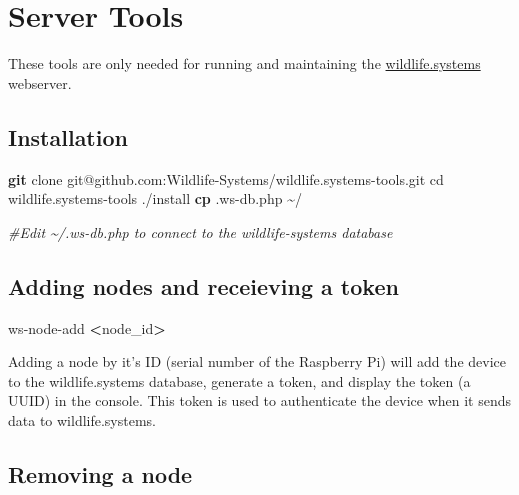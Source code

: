 \documentclass[
]{book}
\newenvironment{Shaded}{\begin{snugshade}}{\end{snugshade}}
\newcommand{\BuiltInTok}[1]{#1}
\newcommand{\CommentTok}[1]{\textcolor[rgb]{0.56,0.35,0.01}{\textit{#1}}}
\newcommand{\ExtensionTok}[1]{#1}
\newcommand{\FunctionTok}[1]{\textcolor[rgb]{0.13,0.29,0.53}{\textbf{#1}}}
\newcommand{\NormalTok}[1]{#1}
\newcommand{\OperatorTok}[1]{\textcolor[rgb]{0.81,0.36,0.00}{\textbf{#1}}}
\begin{document}
\hypertarget{server-tools}{%
\chapter{Server Tools}\label{server-tools}}

These tools are only needed for running and maintaining the \href{https://wildlife.systems}{wildlife.systems} webserver.

\hypertarget{installation}{%
\section{Installation}\label{installation}}

\begin{Shaded}
\begin{Highlighting}[]
\FunctionTok{git}\NormalTok{ clone git@github.com:Wildlife{-}Systems/wildlife.systems{-}tools.git}
\BuiltInTok{cd}\NormalTok{ wildlife.systems{-}tools}
\ExtensionTok{./install}
\FunctionTok{cp}\NormalTok{ .ws{-}db.php \textasciitilde{}/}

\CommentTok{\#Edit \textasciitilde{}/.ws{-}db.php to connect to the wildlife{-}systems database}
\end{Highlighting}
\end{Shaded}

\hypertarget{adding-nodes-and-receieving-a-token}{%
\section{Adding nodes and receieving a token}\label{adding-nodes-and-receieving-a-token}}

\begin{Shaded}
\begin{Highlighting}[]
\ExtensionTok{ws{-}node{-}add} \OperatorTok{\textless{}}\NormalTok{node\_id}\OperatorTok{\textgreater{}}
\end{Highlighting}
\end{Shaded}

Adding a node by it's ID (serial number of the Raspberry Pi) will add the device to the wildlife.systems database, generate a token, and display the token (a UUID) in the console. This token is used to authenticate the device when it sends data to wildlife.systems.

\hypertarget{removing-a-node}{%
\section{Removing a node}\label{removing-a-node}}
\end{document}
